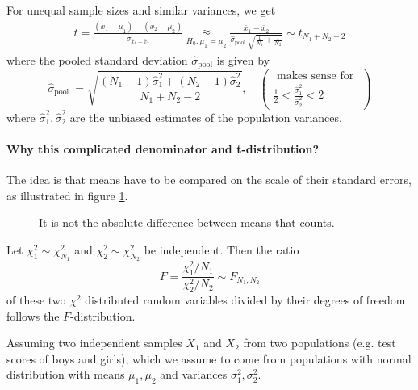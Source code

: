 For unequal sample sizes and similar variances, we get
\begin{equation}
    \begin{gathered}
        t=\frac{\left(\bar{x}_1-\mu_1\right)-\left(\bar{x}_2-\mu_2\right)}{\hat{\sigma}_{\bar{x}_1-\bar{x}_2}} \underset{H_0: \mu_1 = \mu_2}{\approxeq} \frac{\bar{x}_1-\bar{x}_2}{\hat{\sigma}_{\text {pool }} \sqrt{\frac{1}{N_1}+\frac{1}{N_2}}} \sim t_{N_1+N_2-2}
    \end{gathered}
\end{equation}
where the pooled standard deviation $\hat{\sigma}_{\text{pool}}$ is given by
\begin{equation}
    \hat{\sigma}_{\text {pool }}=\sqrt{\frac{\left(N_1-1\right) \hat{\sigma}_1^2+\left(N_2-1\right) \hat{\sigma}_2^2}{N_1+N_2-2}},\quad \left(\begin{array}{c}
    \text { makes sense for } \\
    \frac{1}{2}<\frac{\hat{\sigma}_1^2}{\hat{\sigma}_2^2}<2
    \end{array}\right)
\end{equation}
where $\hat{\sigma}_1^2, \hat{\sigma}_2^2$ are the unbiased estimates of the population variances.

\paragraph*{Why this complicated denominator and t-distribution?} The idea is that means have to be
compared on the scale of their standard errors, as illustrated in figure \ref{fig:means_diff_std}.

\begin{figure}[!htb]
    \centering
    
    \caption{It is not the absolute difference between means that counts.}
    \label{fig:means_diff_std}
\end{figure}

Let $\chi_1^2 \sim \chi_{N_1}^2$ and $\chi_2^2 \sim \chi_{N_2}^2$ be independent. Then the ratio
\begin{equation}
    F = \frac{\chi_1^2 \slash N_1}{\chi_2^2 \slash N_2} \sim F_{N_1,N_2}
\end{equation}
of these two $\chi^2$ distributed random variables divided by their degrees of freedom follows the $F$-distribution.

Assuming two independent samples $X_1$ and $X_2$ from two populations 
(e.g. test scores of boys and girls), which we assume to come from populations
with normal distribution with means $\mu_1, \mu_2$ and variances $\sigma_1^2, \sigma_2^2$.

